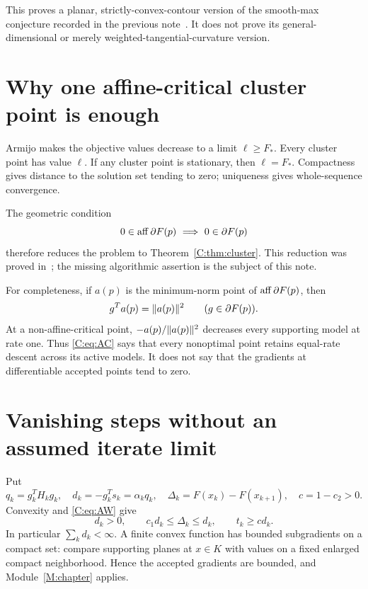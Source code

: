 This proves a planar, strictly-convex-contour version of the smooth-max conjecture recorded in the previous note~\cite{SA}. It does not prove its general-dimensional or merely weighted-tangential-curvature version.


\setcounter{section}{1}
\setcounter{theorem}{3}
\setcounter{equation}{3}
\section{Why one affine-critical cluster point is enough}
Armijo makes the objective values decrease to a limit $\ell\ge F_*$. Every cluster point has value $\ell$. If any cluster point is stationary, then $\ell=F_*$. Compactness gives distance to the solution set tending to zero; uniqueness gives whole-sequence convergence.

The geometric condition
\begin{equation}\label{C:eq:AC}
 0\in\operatorname{aff}\partial F(p)\ \Longrightarrow\ 0\in\partial F(p)
\end{equation}
therefore reduces the problem to Theorem~\ref{C:thm:cluster}. This reduction was proved in~\cite{SA}; the missing algorithmic assertion is the subject of this note.

For completeness, if $a(p)$ is the minimum-norm point of $\operatorname{aff}\partial F(p)$, then
\[
 g^Ta(p)=\lVert a(p)\rVert^2\qquad(g\in\partial F(p)).
\]
At a non-affine-critical point, $-a(p)/\lVert a(p)\rVert^2$ decreases every supporting model at rate one. Thus \eqref{C:eq:AC} says that every nonoptimal point retains equal-rate descent across its active models. It does not say that the gradients at differentiable accepted points tend to zero.


\setcounter{section}{2}
\setcounter{theorem}{3}
\setcounter{equation}{4}
\section{Vanishing steps without an assumed iterate limit}
Put
\[
 q_k=g_k^TH_kg_k,\quad d_k=-g_k^Ts_k=\alpha_kq_k,\quad
 \Delta_k=F(x_k)-F(x_{k+1}),\quad c=1-c_2>0.
\]
Convexity and \eqref{C:eq:AW} give
\begin{equation}\label{C:eq:eligible}
 d_k>0,\qquad c_1d_k\le\Delta_k\le d_k,\qquad t_k\ge c d_k.
\end{equation}
In particular $\sum_k d_k<\infty$. A finite convex function has bounded subgradients on a compact set: compare supporting planes at $x\in K$ with values on a fixed enlarged compact neighborhood. Hence the accepted gradients are bounded, and Module~\ref{M:chapter} applies.

